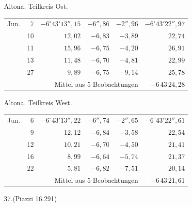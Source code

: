 \noindent\begin{minipage}[t]{.495\textwidth}\centering Altona. Teilkreis Ost.\par\smallskip
{\scriptsize\setlength{\tabcolsep}{1pt}\renewcommand{\arraystretch}{1.2}\begin{tabular}{lr|r|r|r|r|}
Jun.&7&$-6^\circ43'13''{,}15$&$-6''{,}86$&$-2''{,}96$&$-6^\circ43'22''{,}97$\\
&10&$12{,}02$&$-6{,}83$&$-3{,}89$&$22{,}74$\\
&11&$15{,}96$&$-6{,}75$&$-4{,}20$&$26{,}91$\\
&13&$11{,}48$&$-6{,}70$&$-4{,}81$&$22{,}99$\\
&27&$9{,}89$&$-6{,}75$&$-9{,}14$&$25{,}78$\\
\cline{6-6}\multicolumn{5}{r}{Mittel aus 5 Beobachtungen}&$-6\,43\,24{,}28$
\end{tabular}}\end{minipage}\hfill\begin{minipage}[t]{.495\textwidth}\centering Altona. Teilkreis West.\par\smallskip
{\scriptsize\setlength{\tabcolsep}{1pt}\renewcommand{\arraystretch}{1.2}\begin{tabular}{lr|r|r|r|r}
Jun.&6&$-6^\circ43'13''{,}22$&$-6''{,}74$&$-2''{,}65$&$-6^\circ43'22''{,}61$\\
&9&$12{,}12$&$-6{,}84$&$-3{,}58$&$22{,}54$\\
&12&$10{,}21$&$-6{,}70$&$-4{,}50$&$21{,}41$\\
&16&$8{,}99$&$-6{,}64$&$-5{,}74$&$21{,}37$\\
&22&$5{,}81$&$-6{,}82$&$-7{,}51$&$20{,}14$\\
\cline{6-6}\multicolumn{5}{r}{Mittel aus 5 Beobachtungen}&$-6\,43\,21{,}61$
\end{tabular}}\end{minipage}
\par\vspace{4mm}
\begin{center}37.\quad (Piazzi 16.291)\end{center}

